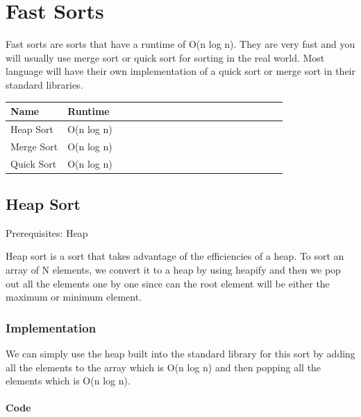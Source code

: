 \documentclass[11pt,oneside]{book}
\begin{document}
    \chapter{ Fast Sorts }
        

Fast sorts are sorts that have a runtime of O(n log n). They are very fast and you will usually use merge sort or quick sort for sorting in the real world. Most language will have their own implementation of a quick sort or merge sort in their standard libraries.

\begin{center}\begin{tabulary}{0.4\linewidth}{|l|l|l|l|l|l|l|l|l|l|l|l|l|l|l|l|l|l|l}\hline


  Name &
  Runtime\\
\hline


  Heap Sort &
  O(n log n)\\

  Merge Sort &
  O(n log n)\\

  Quick Sort &
  O(n log n)\\

\hline\end{tabulary}\end{center}


        \section{ Heap Sort }
        

Prerequisites: Heap

Heap sort is a sort that takes advantage of the efficiencies of a heap. To sort an array of N elements, we convert it to a heap by using heapify and then we pop out all the elements one by one since can the root element will be either the maximum or minimum element.

\subsection{Implementation}

We can simply use the heap built into the standard library for this sort by adding all the elements to the array which is O(n log n) and then popping all the elements which is O(n log n).

\subsubsection{Code}
\end{document}
